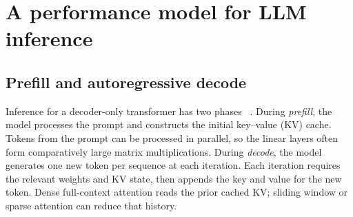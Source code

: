 
\section{A performance model for LLM inference}
\label{sec:inference-model}

\subsection{Prefill and autoregressive decode}

Inference for a decoder-only transformer has two phases
~\cite{na2024llmcpu}.  During
\emph{prefill}, the model processes the prompt and constructs the
initial key--value (KV) cache.  Tokens from the prompt can be processed
in parallel, so the linear layers often form comparatively large matrix
multiplications.  During \emph{decode}, the model generates one new
token per sequence at each iteration.  Each iteration requires the
relevant weights and KV state, then appends the key and value for the new
token.  Dense full-context attention reads the prior cached KV; sliding
window or sparse attention can reduce that history.

